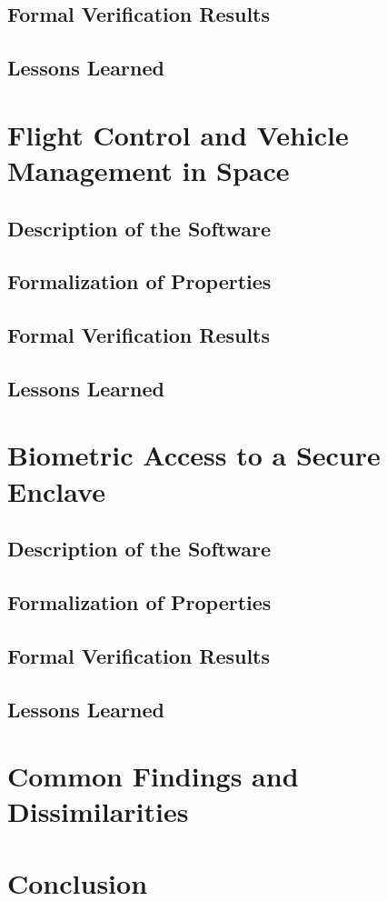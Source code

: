 \documentclass{article}
\begin{document}
\subsection{Formal Verification Results}
\subsection{Lessons Learned}

\section{Flight Control and Vehicle Management in Space}


\subsection{Description of the Software}
\subsection{Formalization of Properties}
\subsection{Formal Verification Results}
\subsection{Lessons Learned}

\section{Biometric Access to a Secure Enclave}


\subsection{Description of the Software}
\subsection{Formalization of Properties}
\subsection{Formal Verification Results}
\subsection{Lessons Learned}

\section{Common Findings and Dissimilarities}

\section{Conclusion}


\end{document}
